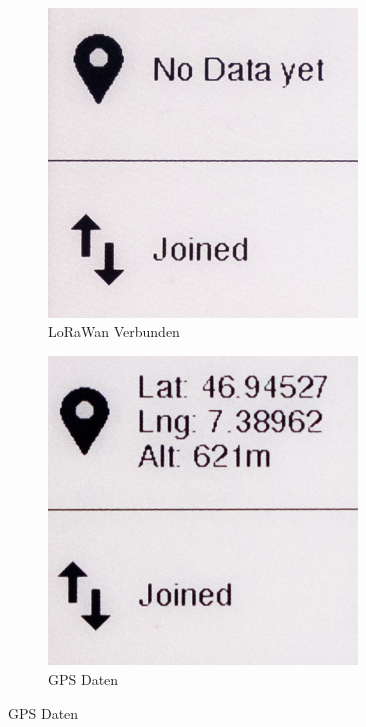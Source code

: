 \documentclass[11pt,english,german]{report}
\theoremstyle{definition}
\begin{document}
\begin{figure}[H]
\begin{subfigure}{.33\textwidth}
		\includegraphics[width=0.9\textwidth]{img/prototype/dashboard_joined.jpg}
		\caption[Bildschirm - LoRaWan Verbunden]
		{LoRaWan Verbunden}
	\end{subfigure}%
	\begin{subfigure}{.33\textwidth}
		\centering
		\includegraphics[width=0.9\textwidth]{img/prototype/dashboard_gps.jpg}
		\caption[Bildschirm - GPS Daten]
		{GPS Daten}
	\end{subfigure}%
\end{figure}
\end{document}
